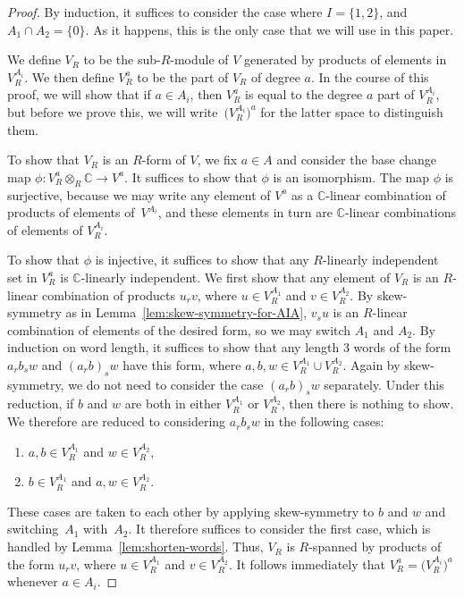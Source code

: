\documentclass[11pt]{article}
\newcommand{\bC}{\mathbb{C}}
\theoremstyle{definition}
\begin{document}
\begin{proof}By induction, it suffices to consider the case where $I = \{1,2\}$, and $A_1 \cap A_2 = \{0\}$. As it happens, this is the only case that we will use in this paper.

We define $V_R$ to be the sub-$R$-module of $V$ generated by products of elements in $V^{A_i}_R$. We then define $V^a_R$ to be the part of $V_R$ of degree $a$. In the course of this proof, we will show that if $a \in A_i$, then $V^a_R$ is equal to the degree $a$ part of $V^{A_i}_R$, but before we prove this, we will write~$\big(V^{A_i}_R\big)^a$ for the latter space to distinguish them.

To show that $V_R$ is an $R$-form of $V$, we fix $a \in A$ and consider the base change map $\phi\colon V^a_R \otimes_{R} \bC \to V^a$. It suffices to show that $\phi$ is an isomorphism. The map $\phi$ is surjective, because we may write any element of $V^a$ as a $\bC$-linear combination of products of elements of~$V^{A_i}$, and these elements in turn are $\bC$-linear combinations of elements of $V^{A_i}_R$.

To show that $\phi$ is injective, it suffices to show that any $R$-linearly independent set in $V^a_R$ is $\bC$-linearly independent. We first show that any element of $V_R$ is an $R$-linear combination of products $u_r v$, where $u \in V^{A_1}_R$ and $v \in V^{A_2}_R$. By skew-symmetry as in Lemma~\ref{lem:skew-symmetry-for-AIA}, $v_s u$ is an $R$-linear combination of elements of the desired form, so we may switch $A_1$ and $A_2$. By induction on word length, it suffices to show that any length 3 words of the form $a_r b_s w$ and $(a_r b)_s w$ have this form, where $a,b,w \in V^{A_1}_R \cup V^{A_2}_R$. Again by skew-symmetry, we do not need to consider the case $(a_r b)_s w$ separately. Under this reduction, if $b$ and $w$ are both in either $V^{A_1}_R$ or $V^{A_2}_R$, then there is nothing to show. We therefore are reduced to considering $a_r b_s w$ in the following cases:
\begin{enumerate}\itemsep=0pt
\item[1)] $a,b \in V^{A_1}_R$ and $w \in V^{A_2}_R$,
\item[2)] $b \in V^{A_1}_R$ and $a, w \in V^{A_2}_R$.
\end{enumerate}
These cases are taken to each other by applying skew-symmetry to $b$ and $w$ and swit\-ching~$A_1$ with~$A_2$. It therefore suffices to consider the first case, which is handled by Lemma~\ref{lem:shorten-words}. Thus, $V_R$ is $R$-spanned by products of the form $u_r v$, where $u \in V^{A_1}_R$ and $v \in V^{A_2}_R$. It follows immediately that $V^a_R = \big(V^{A_i}_R\big)^a$ whenever $a \in A_i$.


\end{proof}
\end{document}
